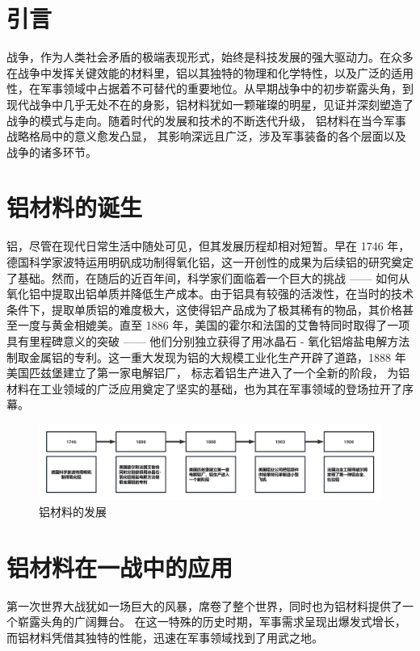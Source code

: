 \documentclass{source/Paper}
\begin{document}
\maketitles
\newpage
\tableofcontents
\newpage
\setcounter{section}{-1}
\section{引言}
战争，作为人类社会矛盾的极端表现形式，始终是科技发展的强大驱动力。在众多在战争中发挥关键效能的材料里，铝以其独特的物理和化学特性，以及广泛的适用性，在军事领域中占据着不可替代的重要地位。从早期战争中的初步崭露头角，到现代战争中几乎无处不在的身影，铝材料犹如一颗璀璨的明星，见证并深刻塑造了战争的模式与走向。随着时代的发展和技术的不断迭代升级，
铝材料在当今军事战略格局中的意义愈发凸显，
其影响深远且广泛，涉及军事装备的各个层面以及战争的诸多环节。
\section{铝材料的诞生}
铝，尽管在现代日常生活中随处可见，但其发展历程却相对短暂。早在 1746 年，德国科学家波特运用明矾成功制得氧化铝，这一开创性的成果为后续铝的研究奠定了基础。然而，在随后的近百年间，科学家们面临着一个巨大的挑战 —— 如何从氧化铝中提取出铝单质并降低生产成本。由于铝具有较强的活泼性，在当时的技术条件下，提取单质铝的难度极大，这使得铝产品成为了极其稀有的物品，其价格甚至一度与黄金相媲美。直至 1886 年，美国的霍尔和法国的艾鲁特同时取得了一项具有里程碑意义的突破 —— 他们分别独立获得了用冰晶石 - 氧化铝熔盐电解方法制取金属铝的专利。这一重大发现为铝的大规模工业化生产开辟了道路，1888 年美国匹兹堡建立了第一家电解铝厂，
标志着铝生产进入了一个全新的阶段，
为铝材料在工业领域的广泛应用奠定了坚实的基础，也为其在军事领域的登场拉开了序幕。
\begin{figure}[htbp]
    \includegraphics[width = 1\textwidth]{pic/图片1.png}
    \caption{铝材料的发展}
\end{figure}

\section{铝材料在一战中的应用}
第一次世界大战犹如一场巨大的风暴，席卷了整个世界，同时也为铝材料提供了一个崭露头角的广阔舞台。
在这一特殊的历史时期，军事需求呈现出爆发式增长，而铝材料凭借其独特的性能，迅速在军事领域找到了用武之地。
\end{document}
